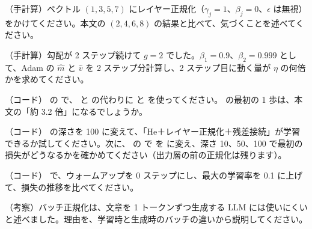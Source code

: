 \begin{exercises}
\item （手計算）ベクトル $(1, 3, 5, 7)$ にレイヤー正規化（$\gamma_j=1$、$\beta_j=0$、$\epsilon$ は無視）をかけてください。本文の $(2,4,6,8)$ の結果と比べて、気づくことを述べてください。
\item （手計算）勾配が 2 ステップ続けて $g=2$ でした。$\beta_1=0.9$、$\beta_2=0.999$ として、Adam の $\hat m$ と $\hat v$ を 2 ステップ分計算し、2 ステップ目に動く量が $\eta$ の何倍かを求めてください。
\item （コード） の  で、 と  の代わりに  と  を使ってください。 の最初の 1 歩は、本文の「約 3.2 倍」になるでしょうか。
\item （コード） の深さを 100 に変えて、「He＋レイヤー正規化＋残差接続」が学習できるか試してください。次に、 の  で  を  に変え、深さ 10、50、100 で最初の損失がどうなるかを確かめてください（出力層の前の正規化は残ります）。
\item （コード） で、ウォームアップを 0 ステップにし、最大の学習率を 0.1 に上げて、損失の推移を比べてください。
\item （考察）バッチ正規化は、文章を 1 トークンずつ生成する LLM には使いにくいと述べました。理由を、学習時と生成時のバッチの違いから説明してください。
\end{exercises}
